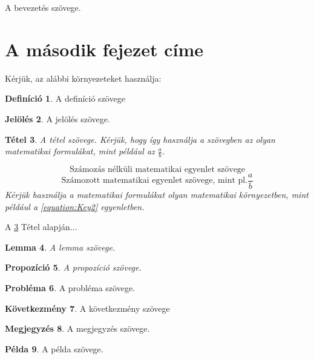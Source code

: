 \documentclass[a4paper,12pt]{article}
\newtheorem{theorem}{Tétel}[section]
\newtheorem{lemma}[theorem]{Lemma}
\newtheorem{proposition}[theorem]{Propozíció}%
\theoremstyle{definition}
\newtheorem{definition}[theorem]{Definíció}
\newtheorem{notation}[theorem]{Jelölés}
\newtheorem{problem}[theorem]{Probléma}%
\newtheorem{corollary}[theorem]{Következmény}%
\newtheorem{remark}[theorem]{Megjegyzés}%
\newtheorem{example}[theorem]{Példa}%
\begin{document}
A bevezetés szövege. 

\section{A második fejezet címe}

Kérjük, az alábbi környezeteket használja:

\begin{definition}
A definíció szövege
\end{definition}

\begin{notation}
A jelölés szövege.
\end{notation}

\begin{theorem}\label{theorem:Key1}
A tétel szövege. Kérjük, hogy így használja a szövegben az olyan matematikai formulákat, mint például az $\frac{a}{b}$. 
\par 
\[
\text{Számozás nélküli matematikai egyenlet szövege}
\]
\begin{equation}\label{equation:Key2}
\text{Számozott matematikai egyenlet szövege, mint pl.} \dfrac{a}{b}
\end{equation}
Kérjük használja a matematikai formulákat olyan matematikai környezetben, mint például a \ref{equation:Key2} egyenletben. 
\end{theorem}

\par A \ref{theorem:Key1} Tétel alapján...

\begin{lemma}
A lemma szövege.
\end{lemma}

\begin{proposition}
A propozíció szövege. 
\end{proposition}

\begin{problem}
A probléma szövege. 
\end{problem}

\begin{corollary}
A következmény szövege
\end{corollary}

\begin{remark}
A megjegyzés szövege. 
\end{remark}

\begin{example}
A példa szövege. 
\end{example}
\end{document}
